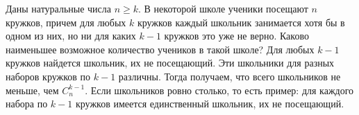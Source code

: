 \problem
Даны натуральные числа $n \geq k$.
В некоторой школе ученики посещают $n$ кружков, причем для любых $k$ кружков
каждый школьник занимается хотя бы в одном из них, но ни для каких $k - 1$
кружков это уже не верно.
Каково наименьшее возможное количество учеников в такой школе?
\solution
Для любых $k - 1$ кружков найдется школьник, их не посещающий.
Эти школьники для разных наборов кружков по $k - 1$ различны.
Тогда получаем, что всего школьников не меньше, чем $C_{n}^{k - 1}$.
Если школьников ровно столько, то есть пример: для каждого набора по $k - 1$
кружков имеется единственный школьник, их не посещающий.
\endproblem

